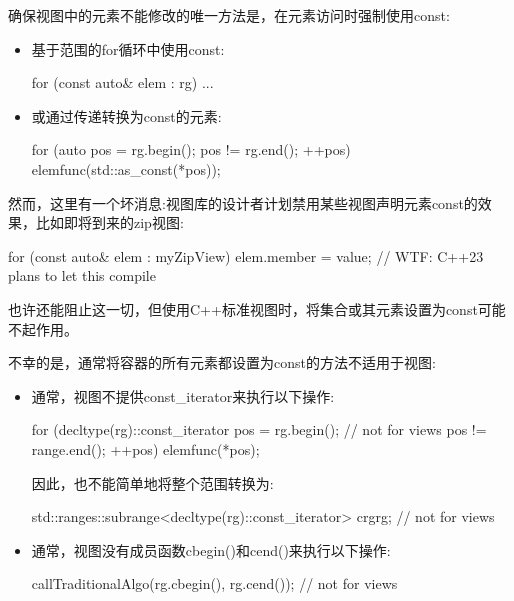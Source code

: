 确保视图中的元素不能修改的唯一方法是，在元素访问时强制使用const:

\begin{itemize}
\item
基于范围的for循环中使用const:

\begin{cpp}
for (const auto& elem : rg) {
	...
}
\end{cpp}

\item
或通过传递转换为const的元素:

\begin{cpp}
for (auto pos = rg.begin(); pos != rg.end(); ++pos) {
	elemfunc(std::as_const(*pos));
}
\end{cpp}
\end{itemize}

然而，这里有一个坏消息:视图库的设计者计划禁用某些视图声明元素const的效果，比如即将到来的zip视图:

\begin{cpp}
for (const auto& elem : myZipView) {
	elem.member = value; // WTF: C++23 plans to let this compile
}
\end{cpp}

也许还能阻止这一切，但使用C++标准视图时，将集合或其元素设置为const可能不起作用。


不幸的是，通常将容器的所有元素都设置为const的方法不适用于视图:

\begin{itemize}
\item
通常，视图不提供const\_iterator来执行以下操作:

\begin{cpp}
for (decltype(rg)::const_iterator pos = rg.begin(); // not for views
pos != range.end();
++pos) {
	elemfunc(*pos);
}
\end{cpp}

因此，也不能简单地将整个范围转换为:

\begin{cpp}
std::ranges::subrange<decltype(rg)::const_iterator> crg{rg}; // not for views
\end{cpp}

\item
通常，视图没有成员函数cbegin()和cend()来执行以下操作:

\begin{cpp}
callTraditionalAlgo(rg.cbegin(), rg.cend()); // not for views
\end{cpp}
\end{itemize}

